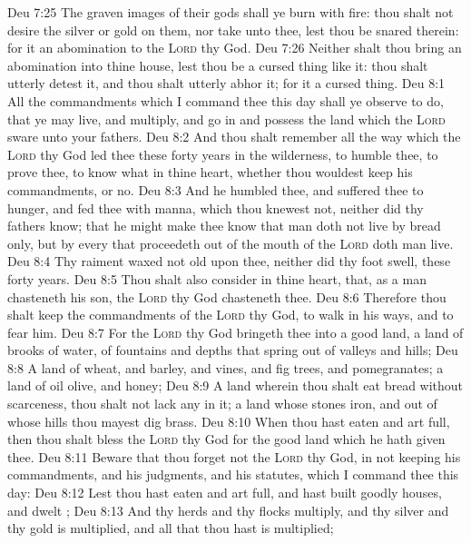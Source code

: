 \vs Deu 7:25 The graven images of their gods shall ye burn with fire: thou shalt not desire the silver or gold  on them, nor take  unto thee, lest thou be snared therein: for it  an abomination to the \textsc{Lord} thy God.
\vs Deu 7:26 Neither shalt thou bring an abomination into thine house, lest thou be a cursed thing like it:  thou shalt utterly detest it, and thou shalt utterly abhor it; for it  a cursed thing.
\vs Deu 8:1 All the commandments which I command thee this day shall ye observe to do, that ye may live, and multiply, and go in and possess the land which the \textsc{Lord} sware unto your fathers.
\vs Deu 8:2 And thou shalt remember all the way which the \textsc{Lord} thy God led thee these forty years in the wilderness, to humble thee,  to prove thee, to know what  in thine heart, whether thou wouldest keep his commandments, or no.
\vs Deu 8:3 And he humbled thee, and suffered thee to hunger, and fed thee with manna, which thou knewest not, neither did thy fathers know; that he might make thee know that man doth not live by bread only, but by every  that proceedeth out of the mouth of the \textsc{Lord} doth man live.
\vs Deu 8:4 Thy raiment waxed not old upon thee, neither did thy foot swell, these forty years.
\vs Deu 8:5 Thou shalt also consider in thine heart, that, as a man chasteneth his son,  the \textsc{Lord} thy God chasteneth thee.
\vs Deu 8:6 Therefore thou shalt keep the commandments of the \textsc{Lord} thy God, to walk in his ways, and to fear him.
\vs Deu 8:7 For the \textsc{Lord} thy God bringeth thee into a good land, a land of brooks of water, of fountains and depths that spring out of valleys and hills;
\vs Deu 8:8 A land of wheat, and barley, and vines, and fig trees, and pomegranates; a land of oil olive, and honey;
\vs Deu 8:9 A land wherein thou shalt eat bread without scarceness, thou shalt not lack any  in it; a land whose stones  iron, and out of whose hills thou mayest dig brass.
\vs Deu 8:10 When thou hast eaten and art full, then thou shalt bless the \textsc{Lord} thy God for the good land which he hath given thee.
\vs Deu 8:11 Beware that thou forget not the \textsc{Lord} thy God, in not keeping his commandments, and his judgments, and his statutes, which I command thee this day:
\vs Deu 8:12 Lest  thou hast eaten and art full, and hast built goodly houses, and dwelt ;
\vs Deu 8:13 And  thy herds and thy flocks multiply, and thy silver and thy gold is multiplied, and all that thou hast is multiplied;
